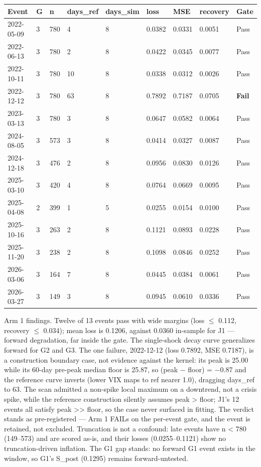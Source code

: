 \documentclass[11pt]{article}
\begin{document}
\begin{table}[htbp]
\centering
\begin{tabular}{lllllllll}
\toprule
\textbf{Event} & \textbf{G} & \textbf{n} & \textbf{days\_ref} & \textbf{days\_sim} & \textbf{loss} & \textbf{MSE} & \textbf{recovery} & \textbf{Gate} \\
\midrule
2022-05-09 & 3 & 780 & 4 & 8 & 0.0382 & 0.0331 & 0.0051 & Pass \\
2022-06-13 & 3 & 780 & 2 & 8 & 0.0422 & 0.0345 & 0.0077 & Pass \\
2022-10-11 & 3 & 780 & 10 & 8 & 0.0338 & 0.0312 & 0.0026 & Pass \\
2022-12-12 & 3 & 780 & 63 & 8 & 0.7892 & 0.7187 & 0.0705 & \textbf{Fail} \\
2023-03-13 & 3 & 780 & 3 & 8 & 0.0647 & 0.0582 & 0.0064 & Pass \\
2024-08-05 & 3 & 573 & 3 & 8 & 0.0414 & 0.0327 & 0.0087 & Pass \\
2024-12-18 & 3 & 476 & 2 & 8 & 0.0956 & 0.0830 & 0.0126 & Pass \\
2025-03-10 & 3 & 420 & 4 & 8 & 0.0764 & 0.0669 & 0.0095 & Pass \\
2025-04-08 & 2 & 399 & 1 & 5 & 0.0255 & 0.0154 & 0.0100 & Pass \\
2025-10-16 & 3 & 263 & 2 & 8 & 0.1121 & 0.0893 & 0.0228 & Pass \\
2025-11-20 & 3 & 238 & 2 & 8 & 0.1098 & 0.0846 & 0.0252 & Pass \\
2026-03-06 & 3 & 164 & 7 & 8 & 0.0445 & 0.0384 & 0.0061 & Pass \\
2026-03-27 & 3 & 149 & 3 & 8 & 0.0945 & 0.0610 & 0.0336 & Pass \\
\bottomrule
\end{tabular}
\end{table}

Arm 1 findings. Twelve of 13 events pass with wide margins (loss $\leq$ 0.112, recovery $\leq$ 0.034); mean loss is 0.1206, against 0.0360 in-sample for J1 --- forward degradation, far inside the gate. The single-shock decay curve generalizes forward for G2 and G3. The one failure, 2022-12-12 (loss 0.7892, MSE 0.7187), is a construction boundary case, not evidence against the kernel: its peak is 25.00 while its 60-day pre-peak median floor is 25.87, so (peak $-$ floor) = $-$0.87 and the reference curve inverts (lower VIX maps to ref nearer 1.0), dragging days\_ref to 63. The scan admitted a non-spike local maximum on a downtrend, not a crisis spike, while the reference construction silently assumes peak > floor; J1's 12 events all satisfy peak >> floor, so the case never surfaced in fitting. The verdict stands as pre-registered --- Arm 1 FAILs on the per-event gate, and the event is retained, not excluded. Truncation is not a confound: late events have n < 780 (149--573) and are scored as-is, and their losses (0.0255--0.1121) show no truncation-driven inflation. The G1 gap stands: no forward G1 event exists in the window, so G1's S\_post (0.1295) remains forward-untested.
\end{document}
